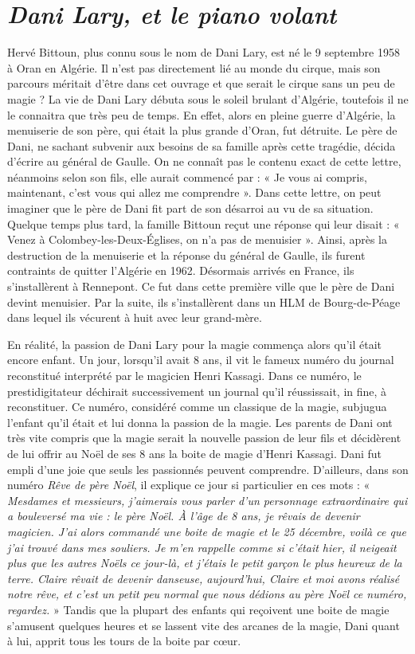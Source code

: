 \section*{\textit{Dani Lary, et le piano volant}}
{}
\noindent
Hervé Bittoun, plus connu sous le nom de Dani Lary, est né le 9 septembre 1958 à Oran en Algérie. Il n’est pas directement lié au monde du cirque, mais son parcours méritait d’être dans cet ouvrage et que serait le cirque sans un peu de magie ? La vie de Dani Lary débuta sous le soleil brulant d’Algérie, toutefois il ne le connaitra que très peu de temps. En effet, alors en pleine guerre d’Algérie, la menuiserie de son père, qui était la plus grande d’Oran, fut détruite. Le père de Dani, ne sachant subvenir aux besoins de sa famille après cette tragédie, décida d'écrire au général de Gaulle. On ne connaît pas le contenu exact de cette lettre, néanmoins selon son fils, elle aurait commencé par : « Je vous ai compris, maintenant, c'est vous qui allez me comprendre ». Dans cette lettre, on peut imaginer que le père de Dani fit part de son désarroi au vu de sa situation. Quelque temps plus tard, la famille Bittoun reçut une réponse qui leur disait : « Venez à Colombey-les-Deux-Églises, on n'a pas de menuisier ». Ainsi, après la destruction de la menuiserie et la réponse du général de Gaulle, ils furent contraints de quitter l’Algérie en 1962. Désormais arrivés en France, ils s’installèrent à Rennepont. Ce fut dans cette première ville que le père de Dani devint menuisier. Par la suite, ils s’installèrent dans un HLM de Bourg-de-Péage dans lequel ils vécurent à huit avec leur grand-mère.

En réalité, la passion de Dani Lary pour la magie commença alors qu’il était encore enfant. Un jour, lorsqu'il avait 8 ans, il vit le fameux numéro du journal reconstitué interprété par le magicien Henri Kassagi. Dans ce numéro, le prestidigitateur déchirait successivement un journal qu’il réussissait, in fine, à reconstituer. Ce numéro, considéré comme un classique de la magie, subjugua l’enfant qu’il était et lui donna la passion de la magie. Les parents de Dani ont très vite compris que la magie serait la nouvelle passion de leur fils et décidèrent de lui offrir au Noël de ses 8 ans la boite de magie d’Henri Kassagi. Dani fut empli d’une joie que seuls les passionnés peuvent comprendre. D’ailleurs, dans son numéro \textit{Rêve de père Noël}, il explique ce jour si particulier en ces mots : «\textit{ Mesdames et messieurs, j’aimerais vous parler d’un personnage extraordinaire qui a bouleversé ma vie : le père Noël. À l’âge de 8 ans, je rêvais de devenir magicien. J'ai alors commandé une boite de magie et le 25 décembre, voilà ce que j’ai trouvé dans mes souliers. Je m’en rappelle comme si c’était hier, il neigeait plus que les autres Noëls ce jour-là, et j’étais le petit garçon le plus heureux de la terre. Claire rêvait de devenir danseuse, aujourd'hui, Claire et moi avons réalisé notre rêve, et c’est un petit peu normal que nous dédions au père Noël ce numéro, regardez. }» Tandis que la plupart des enfants qui reçoivent une boite de magie s’amusent quelques heures et se lassent vite des arcanes de la magie, Dani quant à lui, apprit tous les tours de la boite par cœur. 

